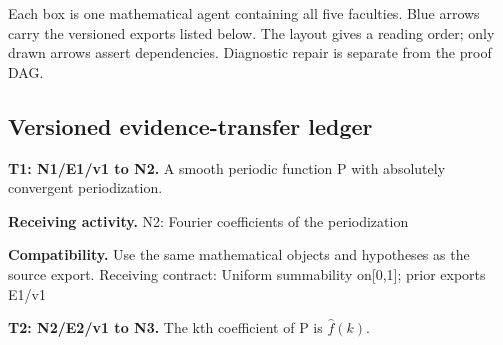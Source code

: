 \documentclass[preprint,12pt,aps,pra,showkeys,amsmath,amssymb,superscriptaddress,floatfix]{revtex4-2}
\theoremstyle{definition}
\theoremstyle{remark}
\newcommand{\field}[2]{\par\smallskip\noindent\textbf{#1.} #2\par}
\begin{document}
\begin{center}\end{center}

Each box is one mathematical agent containing all five faculties. Blue
arrows carry the versioned exports listed below. The layout gives a
reading order; only drawn arrows assert dependencies. Diagnostic repair
is separate from the proof DAG.

\subsection{Versioned evidence-transfer ledger}

\begingroup\small\linespread{1.05}\selectfont

\field{T1: N1/E1/v1 to N2}{A smooth periodic function P with absolutely convergent periodization.}

\field{Receiving activity}{N2: Fourier coefficients of the periodization}

\field{Compatibility}{Use the same mathematical objects and hypotheses as the source export.
Receiving contract: Uniform summability on{[}0,1{]}; prior exports E1/v1}

\field{T2: N2/E2/v1 to N3}{The kth coefficient of P is \(\widehat f(k)\).}
\end{document}
